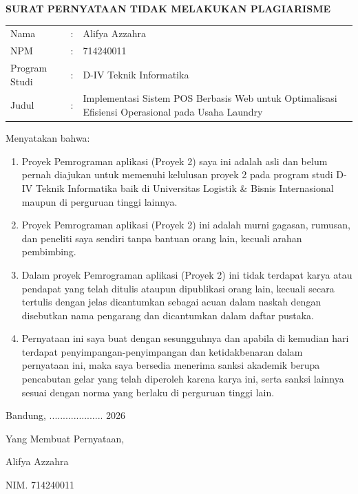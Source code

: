 
\begin{center}
    {\fontsize{14}{16}\selectfont\bfseries SURAT PERNYATAAN TIDAK MELAKUKAN PLAGIARISME}
\end{center}

\vspace{1cm}

\begin{tabular}{l c p{10cm}}
    Nama & : & Alifya Azzahra \\
    NPM & : & 714240011 \\
    Program Studi & : & D-IV Teknik Informatika \\
    Judul & : & Implementasi Sistem POS Berbasis Web untuk Optimalisasi Efisiensi Operasional pada Usaha Laundry \\
\end{tabular}

\vspace{0.5cm}

\noindent
    Menyatakan bahwa:

\begin{enumerate}[leftmargin=1cm]
    \item Proyek Pemrograman aplikasi (Proyek 2) saya ini adalah asli dan belum pernah diajukan untuk memenuhi kelulusan proyek 2 pada program studi D-IV Teknik Informatika baik di Universitas Logistik & Bisnis Internasional maupun di perguruan tinggi lainnya.
    \item Proyek Pemrograman aplikasi (Proyek 2) ini adalah murni gagasan, rumusan, dan peneliti saya sendiri tanpa bantuan orang lain, kecuali arahan pembimbing.
    \item Dalam proyek Pemrograman aplikasi (Proyek 2) ini tidak terdapat karya atau pendapat yang telah ditulis ataupun dipublikasi orang lain, kecuali secara tertulis dengan jelas dicantumkan sebagai acuan dalam naskah dengan disebutkan nama pengarang dan dicantumkan dalam daftar pustaka.
    \item Pernyataan ini saya buat dengan sesungguhnya dan apabila di kemudian hari terdapat penyimpangan-penyimpangan dan ketidakbenaran dalam pernyataan ini, maka saya bersedia menerima sanksi akademik berupa pencabutan gelar yang telah diperoleh karena karya ini, serta sanksi lainnya sesuai dengan norma yang berlaku di perguruan tinggi lain.
\end{enumerate}

\vspace{1cm}

\noindent
\hfill Bandung, .................... 2026


\noindent
\hfill Yang Membuat Pernyataan,

\vspace{2cm}


\noindent
\hfill Alifya Azzahra

\noindent
\hfill NIM. 714240011
